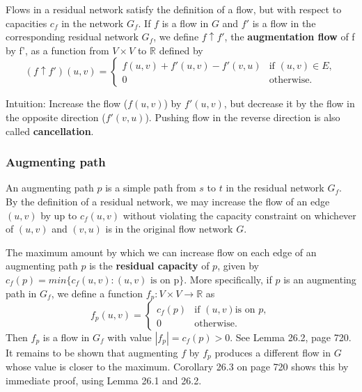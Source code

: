 Flows in a residual network satisfy the definition of a flow, but with respect to capacities
$c_f$ in the network $G_f$. If $f$ is a flow in $G$ and $f'$ is a flow in the corresponding residual
network $G_f$, we define $f \uparrow f'$, the \textbf{augmentation flow} of f by f', as a function
from $V \times V$ to $\mathbb{R}$ defined by
\[
  (f \uparrow f')(u,v) =
  \begin{cases}
  	f(u,v) + f'(u,v) - f'(v,u) & \text{if } (u,v) \in E, \\
  	0 & \text{otherwise.}
  \end{cases}
\]

Intuition: Increase the flow ($f(u,v)$) by $f'(u,v)$, but decrease it by the flow in the
opposite direction ($f'(v,u)$). Pushing flow in the reverse direction is also called \textbf{cancellation}.

\subsubsection{Augmenting path}
An augmenting path $p$ is a simple path from $s$ to $t$ in the residual network $G_f$. By the definition
of a residual network, we may increase the flow of an edge $(u,v)$ by up to $c_f(u,v)$ without violating the
capacity constraint on whichever of $(u,v)$ and $(v,u)$ is in the original flow network $G$.

The maximum amount by which we can increase flow on each edge of an augmenting path $p$ is the
\textbf{residual capacity} of $p$, given by $c_f(p) = min\{c_f(u,v) : (u,v) \text{ is on p}\}$. More specifically,
if $p$ is an augmenting path in $G_f$, we define a function $f_p : V \times V \rightarrow \mathbb{R}$ as
\[
	f_p(u,v) =
	\begin{cases}
		c_f(p) & \text{if } (u,v) \text{is on } p, \\
		0 & \text{otherwise}.
	\end{cases}
\]
Then $f_p$ is a flow in $G_f$ with value $|f_p| = c_f(p) > 0$. See Lemma 26.2, page 720. It remains to be
shown that augmenting $f$ by $f_p$ produces a different flow in $G$ whose value is closer to the maximum.
Corollary 26.3 on page 720 shows this by immediate proof, using Lemma 26.1 and 26.2.